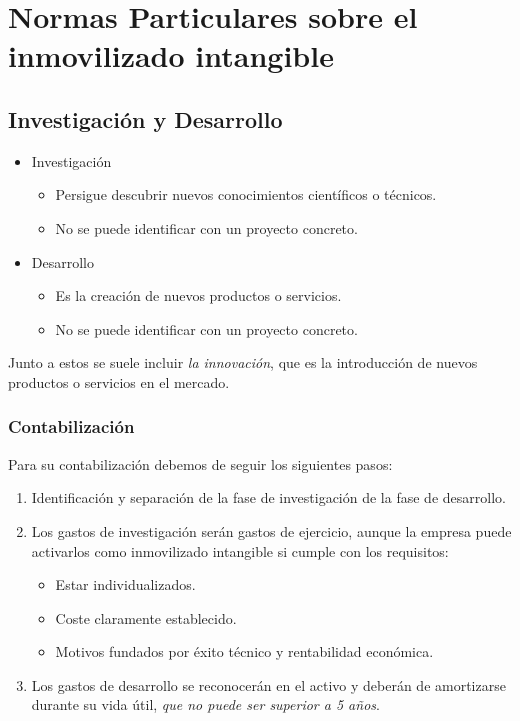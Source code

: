 \documentclass[a4paper,12pt]{article}
\begin{document}
\section{Normas Particulares sobre el inmovilizado intangible}

\subsection{Investigación y Desarrollo}
\begin{itemize}
    \item Investigación
\begin{itemize}
    \item Persigue descubrir nuevos conocimientos científicos o técnicos.
    \item No se puede identificar con un proyecto concreto.
\end{itemize}
\item Desarrollo
\begin{itemize}
    \item Es la creación de nuevos productos o servicios.
    \item No se puede identificar con un proyecto concreto.
\end{itemize}

\end{itemize}

Junto a estos se suele incluir \textit{la innovación}, que es la introducción de nuevos productos o servicios en el mercado.\\

\subsubsection{Contabilización}
Para su contabilización debemos de seguir los siguientes pasos:
\begin{enumerate}
    \item Identificación y separación de la fase de investigación de la fase de desarrollo.
    \item Los gastos de investigación serán gastos de ejercicio, aunque la empresa puede activarlos como inmovilizado intangible si cumple con los requisitos:
    \begin{itemize}
        \item Estar individualizados.
        \item Coste claramente establecido.
        \item Motivos fundados por éxito técnico y rentabilidad económica.
    \end{itemize}
    \item Los gastos de desarrollo se reconocerán en el activo y deberán de amortizarse durante su vida útil, \textit{que no puede ser superior a 5 años}.
\end{enumerate}
\end{document}
